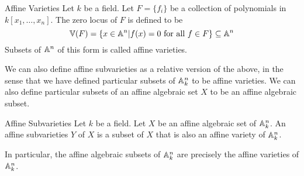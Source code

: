\documentclass[a4paper]{article}
\begin{document}
\begin{defn}{Affine Varieties}{} Let $k$ be a field. Let $F=\{f_i\}$ be a collection of polynomials in $k[x_1,\dots,x_n]$. The zero locus of $F$ is defined to be $$\mathbb{V}(F)=\{x\in\mathbb{A}^n|f(x)=0\text{ for all }f\in F\}\subseteq\mathbb{A}^n$$ Subsets of $\mathbb{A}^n$ of this form is called affine varieties. 
\end{defn}

We can also define affine subvarieties as a relative version of the above, in the sense that we have defined particular subsets of $\mathbb{A}_k^n$ to be affine varieties. We can also define particular subsets of an affine algebraic set $X$ to be an affine algebraic subset. 

\begin{defn}{Affine Subvarieties}{} Let $k$ be a field. Let $X$ be an affine algebraic set of $\mathbb{A}_k^n$. An affine subvarieties $Y$ of $X$ is a subset of $X$ that is also an affine variety of $\mathbb{A}_k^n$. 
\end{defn}

In particular, the affine algebraic subsets of $\mathbb{A}_k^n$ are precisely the affine varieties of $\mathbb{A}_k^n$. 
\end{document}
